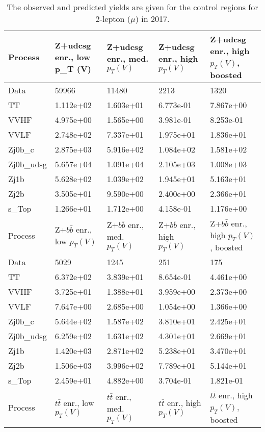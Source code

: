 \begin{table}
\centering
\caption[2017 2-lepton ($\mu$) control region yields]{
                  The observed and predicted yields are given for the
                  control regions for 2-lepton ($\mu$) in 2017.
                  }
{\footnotesize
\begin{tabularx}{\textwidth}{|X|X|X|X|X|}
\hline
Process & Z+udcsg enr., low p_{T} (V) & Z+udcsg enr., med. $p_{T}(V)$ & Z+udcsg enr., high $p_{T}(V)$ & Z+udcsg enr., high $p_{T}(V)$, boosted \\
\hline
Data & 59966 & 11480 & 2213 & 1320 \\
\hline
TT & 1.112e+02 & 1.603e+01 & 6.773e-01 & 7.867e+00 \\
VVHF & 4.975e+00 & 1.565e+00 & 3.981e-01 & 8.253e-01 \\
VVLF & 2.748e+02 & 7.337e+01 & 1.975e+01 & 1.836e+01 \\
Zj0b\_c & 2.875e+03 & 5.916e+02 & 1.084e+02 & 1.581e+02 \\
Zj0b\_udsg & 5.657e+04 & 1.091e+04 & 2.105e+03 & 1.008e+03 \\
Zj1b & 5.628e+02 & 1.039e+02 & 1.945e+01 & 5.163e+01 \\
Zj2b & 3.505e+01 & 9.590e+00 & 2.400e+00 & 2.366e+01 \\
s\_Top & 1.266e+01 & 1.712e+00 & 4.158e-01 & 1.176e+00 \\
\hline
\hline
Process & Z+$b\bar{b}$ enr., low $p_{T}(V)$ & Z+$b\bar{b}$ enr., med. $p_{T}(V)$ & Z+$b\bar{b}$ enr., high $p_{T}(V)$ & Z+$b\bar{b}$ enr., high $p_{T}(V)$, boosted \\
\hline
Data & 5029 & 1245 & 251 & 175 \\
\hline
TT & 6.372e+02 & 3.839e+01 & 8.654e-01 & 4.461e+00 \\
VVHF & 3.725e+01 & 1.388e+01 & 3.959e+00 & 2.373e+00 \\
VVLF & 7.647e+00 & 2.685e+00 & 1.054e+00 & 1.366e+00 \\
Zj0b\_c & 5.644e+02 & 1.587e+02 & 3.810e+01 & 2.425e+01 \\
Zj0b\_udsg & 6.259e+02 & 1.631e+02 & 4.301e+01 & 2.669e+01 \\
Zj1b & 1.420e+03 & 2.871e+02 & 5.238e+01 & 3.470e+01 \\
Zj2b & 1.506e+03 & 3.996e+02 & 7.789e+01 & 5.144e+01 \\
s\_Top & 2.459e+01 & 4.882e+00 & 3.704e-01 & 1.821e-01 \\
\hline
\hline
Process & $t\bar{t}$ enr., low $p_{T}(V)$ & $t\bar{t}$ enr., med. $p_{T}(V)$ & $t\bar{t}$ enr., high $p_{T}(V)$ & $t\bar{t}$ enr., high $p_{T}(V)$, boosted \\

\end{tabularx}}
\end{table}
